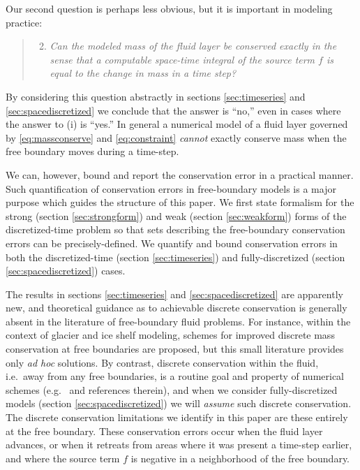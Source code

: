 \documentclass[final,leqno,onefignum,onetabnum]{siamltex1213bueler}
\begin{document}
Our second question is perhaps less obvious, but it is important in modeling practice:
  \begin{quote}
  \renewcommand{\labelenumi}{(\roman{enumi})}
  \begin{enumerate}
  \setcounter{enumi}{1}
  \item \emph{Can the modeled mass of the fluid layer be conserved exactly in the sense that a computable space-time integral of the source term $f$ is equal to the change in mass in a time step?}
  \end{enumerate}
  \end{quote}
By considering this question abstractly in sections \ref{sec:timeseries} and \ref{sec:spacediscretized} we conclude that the answer is ``no,'' even in cases where the answer to (i) is ``yes.''  In general a numerical model of a fluid layer governed by \eqref{eq:massconserve} and \eqref{eq:constraint} \emph{cannot} exactly conserve mass when the free boundary moves during a time-step.

We can, however, bound and report the conservation error in a practical manner.  Such quantification of conservation errors in free-boundary models is a major purpose which guides the structure of this paper.  We first state formalism for the strong (section \ref{sec:strongform}) and weak (section \ref{sec:weakform}) forms of the discretized-time problem so that sets describing the free-boundary conservation errors can be precisely-defined.  We quantify and bound conservation errors in both the discretized-time (section \ref{sec:timeseries}) and fully-discretized (section \ref{sec:spacediscretized}) cases.

The results in sections \ref{sec:timeseries} and \ref{sec:spacediscretized} are apparently new, and theoretical guidance as to achievable discrete conservation is generally absent in the literature of free-boundary fluid problems.  For instance, within the context of glacier \cite{JaroschSchoofAnslow2013} and ice shelf \cite{Albrechtetal2011} modeling, schemes for improved discrete mass conservation at free boundaries are proposed, but this small literature provides only \emph{ad hoc} solutions.  By contrast, discrete conservation within the fluid, i.e.~away from any free boundaries, is a routine goal and property of numerical schemes (e.g.~\cite{LeVeque2002} and references therein), and when we consider fully-discretized models (section \ref{sec:spacediscretized}) we will \emph{assume} such discrete conservation.  The discrete conservation limitations we identify in this paper are these entirely at the free boundary.  These conservation errors occur when the fluid layer advances, or when it retreats from areas where it was present a time-step earlier, and where the source term $f$ is negative in a neighborhood of the free boundary.
\end{document}
